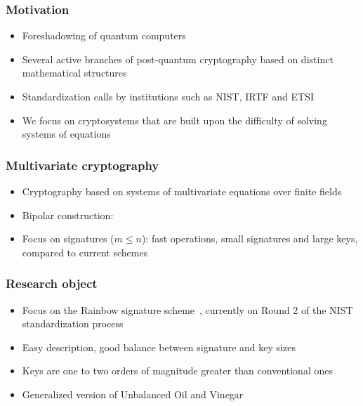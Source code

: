 \documentclass[12pt]{beamer}
\begin{document}
\begin{frame}
  \frametitle{Motivation}
  \begin{itemize}
    \item Foreshadowing of quantum computers
    \item Several active branches of post-quantum cryptography based on
        distinct mathematical structures
    \item Standardization calls by institutions such as NIST, IRTF and ETSI
    \item We focus on cryptosystems that are built upon the difficulty of
        solving systems of equations
  \end{itemize}
\end{frame}

\begin{frame}
  \frametitle{Multivariate cryptography}
  \begin{itemize}
    \item Cryptography based on systems of multivariate equations over finite
        fields
    \item Bipolar construction:
    \begin{figure}
      \vspace{2mm}
      \centering
    \end{figure}
    \item Focus on signatures ($m \leq n$): fast operations, small signatures
        and large keys, compared to current schemes
  \end{itemize}
\end{frame}

\begin{frame}
  \frametitle{Research object}
  \begin{itemize}
    \item Focus on the Rainbow signature scheme~\cite{Ding:inproc:2005:jun},
        currently on Round 2 of the NIST standardization process
    \item Easy description, good balance between signature and key sizes
    \item Keys are one to two orders of magnitude greater than
        conventional ones
    \item Generalized version of Unbalanced Oil and
        Vinegar~\cite{Kipnis:inproc:1999:apr}
  \end{itemize}
\end{frame}
\end{document}
